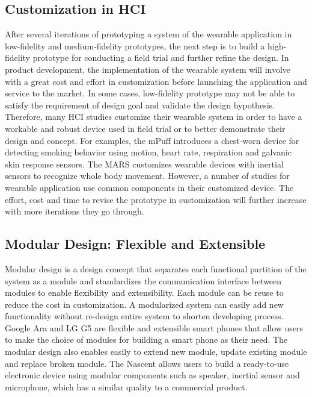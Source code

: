 \subsection{Customization in HCI}
After several iterations of prototyping a system of the wearable application in low-fidelity and medium-fidelity prototypes, the next step is to build a high-fidelity prototype for conducting a field trial and further refine the design. 
In product development, the implementation of the wearable system will involve with a great cost and effort in customization before launching the application and service to the market.
In some cases, low-fidelity prototype may not be able to satisfy the requirement of design goal and validate the design hypothesis. 
Therefore, many HCI studies customize their wearable system in order to have a workable and robust device used in field trial or to better demonstrate their design and concept.
For examples, the mPuff \cite{mPuff:2012:MAD:2185677.2185741} introduces a chest-worn device for detecting smoking behavior using motion, heart rate, respiration and galvanic skin response sensors.
The MARS \cite{Mokaya:2013:MMA:2461381.2461406} customizes wearable devices with inertial sensors to recognize whole body movement.
However, a number of studies for wearable application \cite{mPuff:2012:MAD:2185677.2185741, Lane:2015:ZCD:2742647.2742672, Mokaya:2013:MMA:2461381.2461406, Thompson:2015:DHA:2750858.2807536, Mokaya:2015:MVB:2750858.2804258, Lorincz:2009:MWS:1644038.1644057, Yatani:2012:BWA:2370216.2370269} use common components in their customized device. The effort, cost and time to revise the prototype in customization will further increase with more iterations they go through. 

\subsection{Modular Design: Flexible and Extensible}
Modular design is a design concept that separates each functional partition of the system as a module and standardizes the communication interface between modules to enable flexibility and extensibility.
Each module can be reuse to reduce the cost in customization. A modularized system can easily add new functionality without re-design entire system to shorten developing process.
Google Ara \cite{GoogleAra} and LG G5 \cite{LGG5} are flexible and extensible smart phones that allow users to make the choice of modules for building a smart phone as their need. The modular design also enables easily to extend new module, update existing module and replace broken module.
The Nascent \cite{Nascent} allows users to build a ready-to-use electronic device using modular components such as speaker, inertial sensor and microphone, which has a similar quality to a commercial product.

